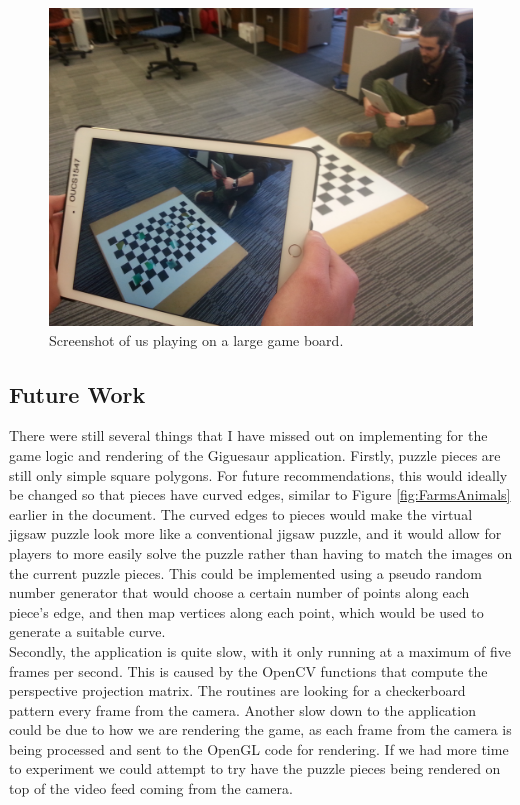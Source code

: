 \documentclass{article}
\begin{document}
\begin{figure}[ht]
\begin{center}
\includegraphics[width=1\textwidth]{images/BigBoardImage}
\caption{Screenshot of us playing on a large game board.}
\label{fig:BigGameBoard}
\end{center}
\end{figure}

\subsection{Future Work}
There were still several things that I have missed out on implementing for the
game logic and rendering of the Giguesaur application. Firstly, puzzle pieces
are still only simple square polygons. For future recommendations, this would
ideally be changed so that pieces have curved edges, similar to Figure
\ref{fig:FarmsAnimals} earlier in the document. The curved edges to pieces would
make the virtual jigsaw puzzle look more like a conventional jigsaw puzzle, and
it would allow for players to more easily solve the puzzle rather than having to
match the images on the current puzzle pieces. This could be implemented using a
pseudo random number generator that would choose a certain number of points
along each piece's edge, and then map vertices along each point, which would be
used to generate a suitable curve.\\

Secondly, the application is quite slow, with it only running at a maximum of
five frames per second. This is caused by the OpenCV functions that compute the
perspective projection matrix. The routines are looking for a checkerboard
pattern every frame from the camera. Another slow down to the application could
be due to how we are rendering the game, as each frame from the camera is being
processed and sent to the OpenGL code for rendering. If we had more time to
experiment we could attempt to try have the puzzle pieces being rendered on top
of the video feed coming from the camera.\\
\end{document}
